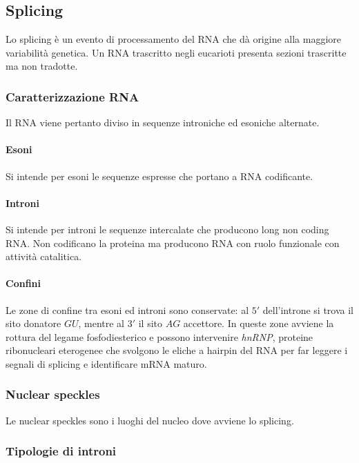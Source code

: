 		
	\subsection{Splicing}
	Lo splicing \`e un evento di processamento del RNA che d\`a origine alla maggiore variabilit\`a genetica.
	Un RNA trascritto negli eucarioti presenta sezioni trascritte ma non tradotte.

		\subsubsection{Caratterizzazione RNA}
		Il RNA viene pertanto diviso in sequenze introniche ed esoniche alternate.
			
			\paragraph{Esoni}
			Si intende per esoni le sequenze espresse che portano a RNA codificante.

			\paragraph{Introni}
			Si intende per introni le sequenze intercalate che producono long non coding RNA.
			Non codificano la proteina ma producono RNA con ruolo funzionale con attivit\`a catalitica.

			\paragraph{Confini}
			Le zone di confine tra esoni ed introni sono conservate: al $5'$ dell'introne si trova il sito donatore $GU$, mentre al $3'$ il sito $AG$ accettore.
			In queste zone avviene la rottura del legame fosfodiesterico e possono intervenire \emph{hnRNP}, proteine ribonucleari eterogenee che svolgono le eliche a hairpin del RNA per far leggere i segnali di splicing e identificare mRNA maturo.
		
		\subsubsection{Nuclear speckles}
		Le nuclear speckles sono i luoghi del nucleo dove avviene lo splicing.

		\subsubsection{Tipologie di introni}

